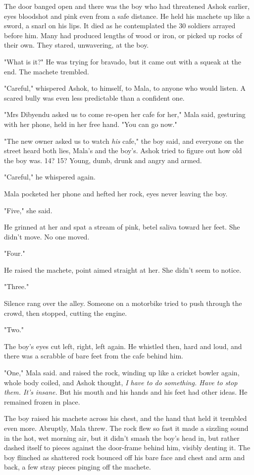 The door banged open and there was the boy who had threatened Ashok
earlier, eyes bloodshot and pink even from a safe distance. He held
his machete up like a sword, a snarl on his lips. It died as he
contemplated the 30 soldiers arrayed before him. Many had produced
lengths of wood or iron, or picked up rocks of their own. They
stared, unwavering, at the boy.

"What is it?" He was trying for bravado, but it came out with a
squeak at the end. The machete trembled.

"Careful," whispered Ashok, to himself, to Mala, to anyone who
would listen. A scared bully was even less predictable than a
confident one.

"Mrs Dibyendu asked us to come re-open her cafe for her," Mala
said, gesturing with her phone, held in her free hand. "You can go
now."

"The new owner asked us to watch \emph{his} cafe," the boy said,
and everyone on the street heard both lies, Mala's and the boy's.
Ashok tried to figure out how old the boy was. 14? 15? Young, dumb,
drunk and angry and armed.

"Careful," he whispered again.

Mala pocketed her phone and hefted her rock, eyes never leaving the
boy.

"Five," she said.

He grinned at her and spat a stream of pink, betel saliva toward
her feet. She didn't move. No one moved.

"Four."

He raised the machete, point aimed straight at her. She didn't seem
to notice.

"Three."

Silence rang over the alley. Someone on a motorbike tried to push
through the crowd, then stopped, cutting the engine.

"Two."

The boy's eyes cut left, right, left again. He whistled then, hard
and loud, and there was a scrabble of bare feet from the cafe
behind him.

"One," Mala said. and raised the rock, winding up like a cricket
bowler again, whole body coiled, and Ashok thought,
\emph{I have to do something. Have to stop them. It's insane.} But
his mouth and his hands and his feet had other ideas. He remained
frozen in place.

The boy raised his machete across his chest, and the hand that held
it trembled even more. Abruptly, Mala threw. The rock flew so fast
it made a sizzling sound in the hot, wet morning air, but it didn't
smash the boy's head in, but rather dashed itself to pieces against
the door-frame behind him, visibly denting it. The boy flinched as
shattered rock bounced off his bare face and chest and arm and
back, a few stray pieces pinging off the machete.

